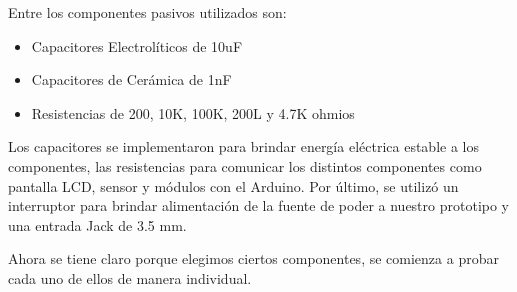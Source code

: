\par \noindent
Entre los componentes pasivos utilizados son: 

\begin{itemize}
	\item Capacitores Electrolíticos de 10uF
	
	\item Capacitores de Cerámica de 1nF
	
	\item Resistencias de 200, 10K, 100K, 200L y 4.7K ohmios
\end{itemize}

\par \noindent
Los capacitores se implementaron para brindar energía eléctrica estable a los componentes, las resistencias para comunicar los distintos componentes como pantalla LCD, sensor y módulos con el Arduino. Por último, se utilizó un interruptor para brindar alimentación de la fuente de poder a nuestro prototipo y una entrada Jack de 3.5 mm.

\par \noindent
Ahora se tiene claro porque elegimos ciertos componentes, se comienza a probar cada uno de ellos de manera individual.
